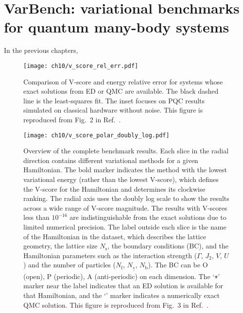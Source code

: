 \chapter{VarBench: variational benchmarks for quantum many-body systems}
\label{ch:varbench}

In the previous chapters,
\begin{figure}[htb]
\centering
\texttt{[image: ch10/v\_score\_rel\_err.pdf]}
\caption[Comparison of V-score and energy relative error]{
Comparison of V-score and energy relative error for systems whose exact solutions from ED or QMC are available.
The black dashed line is the least-squares fit.
The inset focuses on PQC results simulated on classical hardware without noise.
This figure is reproduced from Fig.~2 in Ref.~\cite{wu2023variational}.
}
\label{fig:v-score-rel-err}
\end{figure}

\begin{figure}[htb]
\centering
\hspace*{-0.05\linewidth}
\texttt{[image: ch10/v\_score\_polar\_doubly\_log.pdf]}
\caption[Overview of VarBench results]{
Overview of the complete benchmark results.
Each slice in the radial direction contains different variational methods for a given Hamiltonian. The bold marker indicates the method with the lowest variational energy (rather than the lowest V-score), which defines the V-score for the Hamiltonian and determines its clockwise ranking.
The radial axis uses the doubly log scale to show the results across a wide range of V-score magnitude.
The results with V-scores less than $10^{-16}$ are indistinguishable from the exact solutions due to limited numerical precision.
The label outside each slice is the name of the Hamiltonian in the dataset, which describes the lattice geometry, the lattice size $N_\text{s}$, the boundary conditions (BC), and the Hamiltonian parameters such as the interaction strength ($\Gamma$, $J_2$, $V$, $U$) and the number of particles ($N_\mathrm{f}$, $N_{\uparrow}$, $N_\mathrm{b}$).
The BC can be O (open), P (periodic), A (anti-periodic) on each dimension.
The `\texttt{+}' marker near the label indicates that an ED solution is available for that Hamiltonian, and the `\texttt{\textasteriskcentered}' marker indicates a numerically exact QMC solution.
This figure is reproduced from Fig.~3 in Ref.~\cite{wu2023variational}.
}
\label{fig:v-score}
\end{figure}

